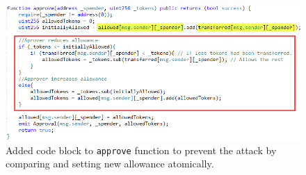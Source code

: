 \begin{figure}[t]
	\centering
	\includegraphics[width=1.0\linewidth]{figures/multiple_withdrawal_15.png}
	\caption{Added code block to \texttt{approve} function to prevent the attack by comparing and setting new allowance atomically.\label{fig:approve1}}
\end{figure}


%	
%	


